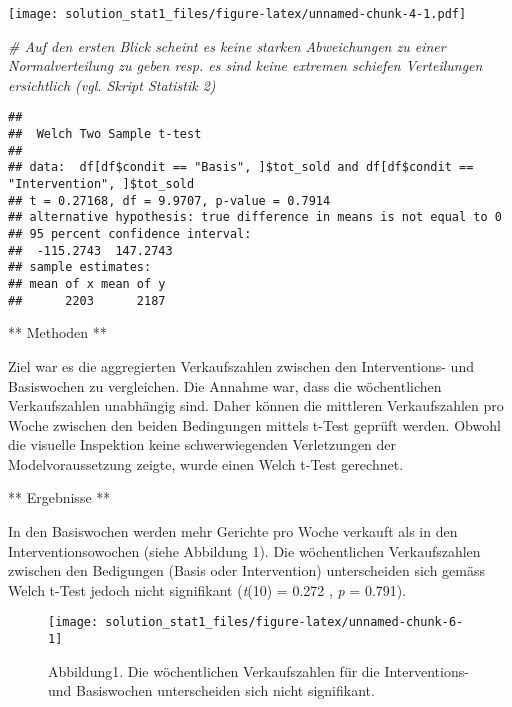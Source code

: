 \documentclass[]{article}
\newenvironment{Shaded}{\begin{snugshade}}{\end{snugshade}}
\newcommand{\CommentTok}[1]{\textcolor[rgb]{0.56,0.35,0.01}{\textit{#1}}}
\newcommand{\DataTypeTok}[1]{\textcolor[rgb]{0.13,0.29,0.53}{#1}}
\newcommand{\KeywordTok}[1]{\textcolor[rgb]{0.13,0.29,0.53}{\textbf{#1}}}
\newcommand{\NormalTok}[1]{#1}
\newcommand{\OperatorTok}[1]{\textcolor[rgb]{0.81,0.36,0.00}{\textbf{#1}}}
\newcommand{\StringTok}[1]{\textcolor[rgb]{0.31,0.60,0.02}{#1}}
\begin{document}
\texttt{[image: solution\_stat1\_files/figure-latex/unnamed-chunk-4-1.pdf]}

\begin{Shaded}
\begin{Highlighting}[]
\CommentTok{# Auf den ersten Blick scheint es keine starken Abweichungen zu einer Normalverteilung zu geben resp. es sind keine extremen schiefen Verteilungen ersichtlich (vgl. Skript Statistik 2)}
\end{Highlighting}
\end{Shaded}

\begin{Shaded}
\end{Shaded}

\begin{verbatim}
## 
##  Welch Two Sample t-test
## 
## data:  df[df$condit == "Basis", ]$tot_sold and df[df$condit == "Intervention", ]$tot_sold
## t = 0.27168, df = 9.9707, p-value = 0.7914
## alternative hypothesis: true difference in means is not equal to 0
## 95 percent confidence interval:
##  -115.2743  147.2743
## sample estimates:
## mean of x mean of y 
##      2203      2187
\end{verbatim}

** Methoden **

Ziel war es die aggregierten Verkaufszahlen zwischen den Interventions-
und Basiswochen zu vergleichen. Die Annahme war, dass die wöchentlichen
Verkaufszahlen unabhängig sind. Daher können die mittleren
Verkaufszahlen pro Woche zwischen den beiden Bedingungen mittels t-Test
geprüft werden. Obwohl die visuelle Inspektion keine schwerwiegenden
Verletzungen der Modelvoraussetzung zeigte, wurde einen Welch t-Test
gerechnet.

** Ergebnisse **

In den Basiswochen werden mehr Gerichte pro Woche verkauft als in den
Interventionsowochen (siehe Abbildung 1). Die wöchentlichen
Verkaufszahlen zwischen den Bedigungen (Basis oder Intervention)
unterscheiden sich gemäss Welch t-Test jedoch nicht signifikant
(\emph{t}(10) = 0.272 , \emph{p} = 0.791).

\begin{figure}
\texttt{[image: solution\_stat1\_files/figure-latex/unnamed-chunk-6-1]} \caption{Abbildung1. Die wöchentlichen Verkaufszahlen für die Interventions- und Basiswochen unterscheiden sich nicht signifikant.}\label{fig:unnamed-chunk-6}
\end{figure}
\end{document}
